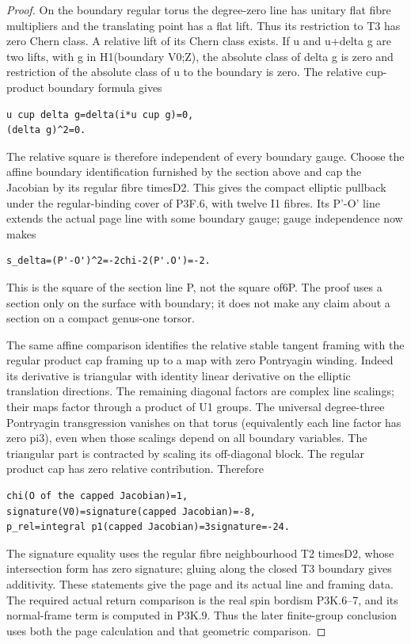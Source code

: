 \begin{proof}
On the boundary regular torus the degree-zero line has unitary flat fibre multipliers and the translating point has a flat lift. Thus its restriction to T3 has zero Chern class. A relative lift of its Chern class exists. If u and u+delta g are two lifts, with g in H1(boundary V0;Z), the absolute class of delta g is zero and restriction of the absolute class of u to the boundary is zero. The relative cup-product boundary formula gives

\begin{lstlisting}
u cup delta g=delta(i*u cup g)=0,
(delta g)^2=0.
\end{lstlisting}

The relative square is therefore independent of every boundary gauge. Choose the affine boundary identification furnished by the section above and cap the Jacobian by its regular fibre timesD2. This gives the compact elliptic pullback under the regular-binding cover of P3F.6, with twelve I1 fibres. Its P'-O' line extends the actual page line with some boundary gauge; gauge independence now makes

\begin{lstlisting}
s_delta=(P'-O')^2=-2chi-2(P'.O')=-2.
\end{lstlisting}

This is the square of the section line P, not the square of6P. The proof uses a section only on the surface with boundary; it does not make any claim about a section on a compact genus-one torsor.

The same affine comparison identifies the relative stable tangent framing with the regular product cap framing up to a map with zero Pontryagin winding. Indeed its derivative is triangular with identity linear derivative on the elliptic translation directions. The remaining diagonal factors are complex line scalings; their maps factor through a product of U1 groups. The universal degree-three Pontryagin transgression vanishes on that torus (equivalently each line factor has zero pi3), even when those scalings depend on all boundary variables. The triangular part is contracted by scaling its off-diagonal block. The regular product cap has zero relative contribution. Therefore

\begin{lstlisting}
chi(O of the capped Jacobian)=1,
signature(V0)=signature(capped Jacobian)=-8,
p_rel=integral p1(capped Jacobian)=3signature=-24.
\end{lstlisting}

The signature equality uses the regular fibre neighbourhood T2 timesD2, whose intersection form has zero signature; gluing along the closed T3 boundary gives additivity. These statements give the page and its actual line and framing data. The required actual return comparison is the real spin bordism P3K.6--7, and its normal-frame term is computed in P3K.9. Thus the later finite-group conclusion uses both the page calculation and that geometric comparison.
\end{proof}

